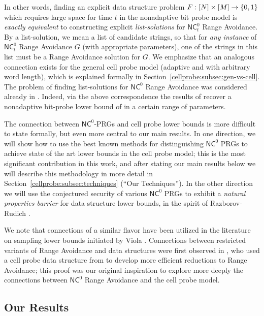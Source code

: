 In other words, finding an explicit data structure problem $F:[N] \times [M] \to \{0,1\}$ which requires large space for time $t$ in the nonadaptive bit probe model is \emph{exactly equivalent} to constructing explicit \emph{list-solutions} for $\mathsf{NC}^0_t$ Range Avoidance. By a list-solution, we mean a list of candidate strings, so that for \emph{any instance} of $\mathsf{NC}^0_t$ Range Avoidance $G$ (with appropriate parameters), one of the strings in this list must be a Range Avoidance solution for $G$. 
We emphasize that an analogous connection exists for the general cell probe model (adaptive and with arbitrary word length), which is explained formally in Section~\ref{cellprobe:subsec:gen-vs-cell}.
The problem of finding list-solutions for $\mathsf{NC}^0$ Range Avoidance was considered already in \cite{guruswami2022range}. Indeed, via the above correspondence the results of \cite{guruswami2022range} recover a nonadaptive bit-probe lower bound of \cite{golovnev} in a certain range of parameters.

The connection between $\mathsf{NC}^0$-PRGs and cell probe lower bounds is more difficult to state formally, but even more central to our main results. In one direction, we will show how to use the best known methods for distinguishing $\mathsf{NC}^0$ PRGs to achieve state of the art lower bounds in the cell probe model; this is the most significant contribution in this work, and after stating our main results below we will describe this methodology in more detail in Section~\ref{cellprobe:subsec:techniques} (``Our Techniques'').
In the other direction we will use the conjectured security of various $\mathsf{NC}^0$ PRGs to exhibit a \emph{natural properties barrier} for data structure lower bounds, in the spirit of Razborov-Rudich \cite{natural-proofs}.

We note that connections of a similar flavor have been utilized in the literature on sampling lower bounds initiated by Viola \cite{viola-sampling}. Connections between restricted variants of Range Avoidance and data structures were first observed in \cite{guruswami2022range}, who used a cell probe data structure from \cite{succincter} to develop more efficient reductions to Range Avoidance; this proof was our original inspiration to explore more deeply the connections between $\mathsf{NC}^0$ Range Avoidance and the cell probe model.

\subsection{Our Results}

